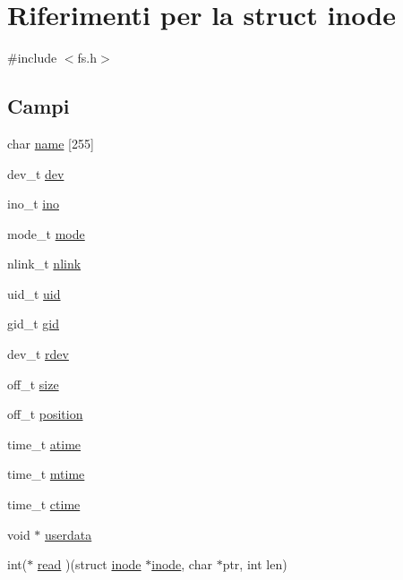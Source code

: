 \hypertarget{structinode}{\section{Riferimenti per la struct inode}
\label{structinode}
}


{\ttfamily \#include $<$fs.\+h$>$}

\subsection*{Campi}
\begin{DoxyCompactItemize}
\item 
char \hyperlink{structinode_ad64802d9d4ebdd1c56af5ab6e302faf0}{name} \mbox{[}255\mbox{]}
\item 
dev\+\_\+t \hyperlink{structinode_a127a2eb030df332fa64a81188731ad6b}{dev}
\item 
ino\+\_\+t \hyperlink{structinode_a1a77be0f24a6c9a18bbdbcecfb75df7c}{ino}
\item 
mode\+\_\+t \hyperlink{structinode_a4902d9f6a1d7bd79c6f1bb73d83ce8e3}{mode}
\item 
nlink\+\_\+t \hyperlink{structinode_a1daedc820c86b5af32f0a137419f7a8f}{nlink}
\item 
uid\+\_\+t \hyperlink{structinode_a0eac94e96ded19029e871d5cce815bcb}{uid}
\item 
gid\+\_\+t \hyperlink{structinode_a8434fb9dd05057d00b37ed713713835d}{gid}
\item 
dev\+\_\+t \hyperlink{structinode_a3e7613383954ff7b5faf7c2188e1f61b}{rdev}
\item 
off\+\_\+t \hyperlink{structinode_a53722b1b60b7136ce0204b66527bb400}{size}
\item 
off\+\_\+t \hyperlink{structinode_a5756f61233e40d01652094d29b5daf6c}{position}
\item 
time\+\_\+t \hyperlink{structinode_a7e52661a115f6def97778566f2be0d80}{atime}
\item 
time\+\_\+t \hyperlink{structinode_a19f0d407fa2962c942e406d3e00c1da4}{mtime}
\item 
time\+\_\+t \hyperlink{structinode_a27334a9d3c25fbac1c134ed5b9cbc566}{ctime}
\item 
void $\ast$ \hyperlink{structinode_a8ba627a7ebbacc723e8452fbf8dd3670}{userdata}
\item 
int($\ast$ \hyperlink{structinode_ae2c5e8a0a372334b97024fbd9ef694c1}{read} )(struct \hyperlink{structinode}{inode} $\ast$\hyperlink{structinode}{inode}, char $\ast$ptr, int len)
\item 

\end{DoxyCompactItemize}
